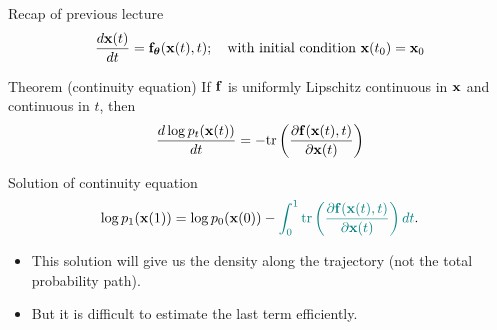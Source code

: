 

\usepackage{tikz}

\usetikzlibrary{arrows,shapes,positioning,shadows,trees}

\begin{frame}
\titlepage
\end{frame}
\begin{frame}{Recap of previous lecture}
	\[
 		\frac{d \mathbf{x}(t)}{dt} = \mathbf{f}_{\boldsymbol{\theta}}(\mathbf{x}(t), t); \quad \text{with initial condition }\mathbf{x}(t_0) = \mathbf{x}_0
	\]
	\vspace{-0.3cm}
	\begin{block}{Theorem (continuity equation)}
		If $\mathbf{f}$ is uniformly Lipschitz continuous in $\mathbf{x}$ and continuous in $t$, then
		\[
			\frac{d \log p_t(\mathbf{x}(t))}{d t} = - \text{tr} \left( \frac{\partial \mathbf{f}(\mathbf{x}(t), t)}{\partial \mathbf{x}(t)} \right)
		\]
		\vspace{-0.5cm}
	\end{block}
	\begin{block}{Solution of continuity equation}
		\vspace{-0.3cm}
		\[
			\log p_1(\mathbf{x}(1)) = \log p_0(\mathbf{x}(0)) - {\color{teal}\int_{0}^{1} \text{tr}  \left( \frac{\partial \mathbf{f}(\mathbf{x}(t), t)}{\partial \mathbf{x}(t)} \right) dt}.
		\]
	\end{block}
	\begin{itemize}
		\item This solution will give us the density along the trajectory (not the total probability path).
		\item But it is difficult to estimate {\color{teal}the last term} efficiently.
	 \end{itemize}
\end{frame}
